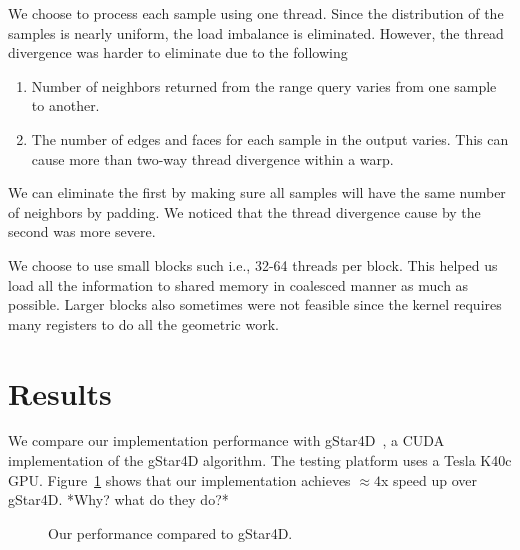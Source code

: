 \documentclass[12pt] {article}
\begin{document}
We choose to process each sample using one thread. Since the distribution of the samples is nearly uniform, the load imbalance is eliminated. However, the thread divergence was harder to eliminate due to the following 
\begin{enumerate}
\item Number of neighbors returned from the range query varies from one sample to another. 
\item The number of edges and faces for each sample in the output varies. This can cause more than two-way thread divergence within a warp. 
\end{enumerate}

We can eliminate the first by making sure all samples will have the same number of neighbors by padding. We noticed that the thread divergence cause by the second was more severe. 

We choose to use small blocks such i.e., 32-64 threads per block. This helped us load all the information to shared memory in coalesced manner as much as possible. Larger blocks also sometimes were not feasible since the kernel requires many registers to do all the geometric work. 

\section*{Results}

We compare our implementation performance with gStar4D~\citep{Ashwin2012GPUDelaunay}, a CUDA implementation of the gStar4D algorithm. The testing platform uses a Tesla K40c GPU. Figure~\ref{fig:timing} shows that our implementation achieves $\approx4$x speed up over gStar4D. *Why? what do they do?*

\begin{figure}[!tbh]
\centering        
   \caption{Our performance compared to gStar4D.}
   \label{fig:timing}
\end{figure}


\end{document}
